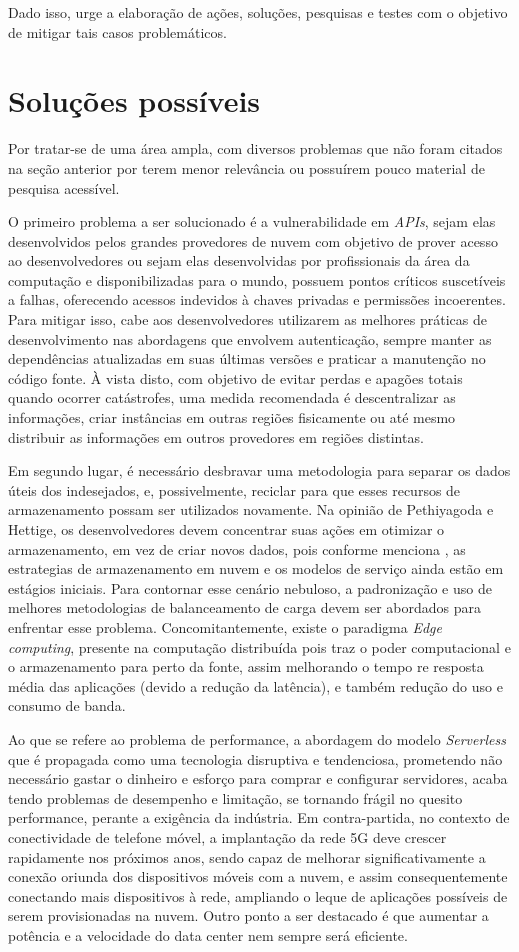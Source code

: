 \documentclass[12pt]{article}
\begin{document}
Dado isso, urge a elaboração de ações, soluções, pesquisas e testes com o objetivo de mitigar tais casos problemáticos.

\section{Soluções possíveis}
Por tratar-se de uma área ampla, com diversos problemas que não foram citados na seção anterior por terem menor relevância ou possuírem pouco material de pesquisa acessível.

O primeiro problema a ser solucionado é a vulnerabilidade em \emph{APIs}, sejam elas desenvolvidos pelos grandes provedores de nuvem com objetivo de prover acesso ao desenvolvedores ou sejam elas desenvolvidas por profissionais da área da computação e disponibilizadas para o mundo, possuem pontos críticos suscetíveis a falhas, oferecendo acessos indevidos à chaves privadas e permissões incoerentes. Para mitigar isso, cabe aos desenvolvedores utilizarem as melhores práticas de desenvolvimento nas abordagens que envolvem autenticação, sempre manter as dependências atualizadas em suas últimas versões e praticar a manutenção no código fonte. À vista disto, com objetivo de evitar perdas e apagões totais quando ocorrer catástrofes, uma medida recomendada é descentralizar as informações, criar instâncias em outras regiões fisicamente ou até mesmo distribuir as informações em outros provedores em regiões distintas.

Em segundo lugar, é necessário desbravar uma metodologia para separar os dados úteis dos indesejados, e, possivelmente, reciclar para que esses recursos de armazenamento possam ser utilizados novamente. Na opinião de Pethiyagoda e Hettige, os desenvolvedores devem concentrar suas ações em otimizar o armazenamento, em vez de criar novos dados, pois conforme menciona \cite{shanthi}, as estrategias de armazenamento em nuvem e os modelos de serviço ainda estão em estágios iniciais. Para contornar esse cenário nebuloso, a padronização e uso de melhores metodologias de balanceamento de carga devem ser abordados para enfrentar esse problema. Concomitantemente, existe o paradigma \emph{Edge computing}, presente na computação distribuída pois traz o poder computacional e o armazenamento para perto da fonte, assim melhorando o tempo re resposta média das aplicações (devido a redução da latência), e também redução do uso e consumo de banda.

Ao que se refere ao problema de performance, a abordagem do modelo \emph{Serverless} que é propagada como uma tecnologia disruptiva e tendenciosa, prometendo não necessário gastar o dinheiro e esforço para comprar e configurar servidores, acaba tendo problemas de desempenho e limitação, se tornando frágil no quesito performance, perante a exigência da indústria. Em contra-partida, no contexto de conectividade de telefone móvel, a implantação da rede 5G deve crescer rapidamente nos próximos anos, sendo capaz de melhorar significativamente a conexão oriunda dos dispositivos móveis com a nuvem, e assim consequentemente conectando mais dispositivos à rede, ampliando o leque de aplicações possíveis de serem provisionadas na nuvem. Outro ponto a ser destacado é que aumentar a potência e a velocidade do data center nem sempre será eficiente.
\end{document}
